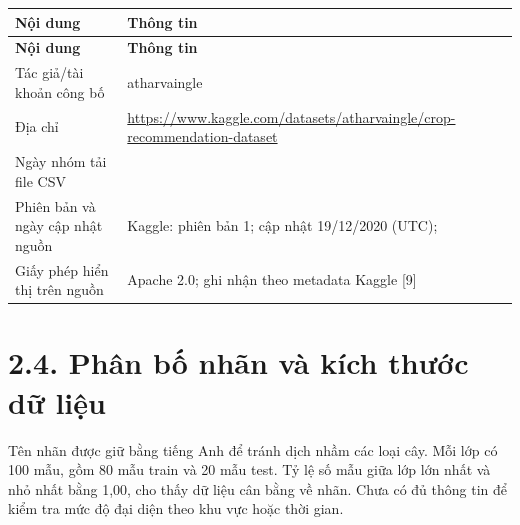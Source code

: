 \begingroup
{}
\label{tab:3}
\fontsize{11.5}{13.5}\selectfont{}
\renewcommand{\arraystretch}{1.15}
\begin{longtable*}{|>{\raggedright\arraybackslash}p{\arrayrulewidth\relax}|>{\raggedright\arraybackslash}p{\arrayrulewidth\relax}|}
\hline \textbf{Nội dung} & \textbf{Thông tin} \\ \hline
\endfirsthead
\hline \textbf{Nội dung} & \textbf{Thông tin} \\ \hline
\endhead
Tác giả/tài khoản công bố & atharvaingle \\ \hline
Địa chỉ & \url{https://www.kaggle.com/datasets/atharvaingle/crop-recommendation-dataset} \\ \hline
Ngày nhóm tải file CSV & \rule{0pt}{15pt} \\ \hline
Phiên bản và ngày cập nhật nguồn & Kaggle: phiên bản 1; cập nhật 19/12/2020 (UTC);  \\ \hline
Giấy phép hiển thị trên nguồn & Apache 2.0; ghi nhận theo metadata Kaggle [9] \\ \hline
\end{longtable*}
\endgroup


\clearpage

\section{2.4. Phân bố nhãn và kích thước dữ liệu}

Tên nhãn được giữ bằng tiếng Anh để tránh dịch nhầm các loại cây. Mỗi lớp có 100 mẫu, gồm 80 mẫu train và 20 mẫu test. Tỷ lệ số mẫu giữa lớp lớn nhất và nhỏ nhất bằng 1,00, cho thấy dữ liệu cân bằng về nhãn. Chưa có đủ thông tin để kiểm tra mức độ đại diện theo khu vực hoặc thời gian.


